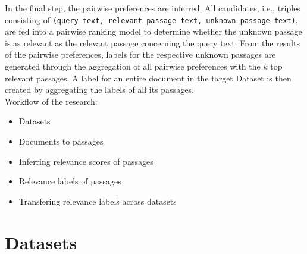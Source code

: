 In the final step, the pairwise preferences are inferred. All candidates, i.e., triples consisting of \texttt{(query text, relevant passage text, unknown passage text)}, are fed into a pairwise ranking model to determine whether the unknown passage is as relevant as the relevant passage concerning the query text. From the results of the pairwise preferences, labels for the respective unknown passages are generated through the aggregation of all pairwise preferences with the $k$ top relevant passages. A label for an entire document in the target Dataset is then created by aggregating the labels of all its passages.
\\
Workflow of the research:
\begin{itemize}
    \item Datasets
    \item Documents to passages
    \item Inferring relevance scores of passages
    \item Relevance labels of passages
    \item Transfering relevance labels across datasets
\end{itemize}

\section{Datasets}\label{datasets}

